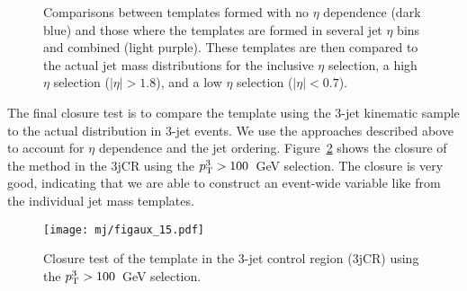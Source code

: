 \begin{figure}[!ht]
  \centering
  
    
  \caption{Comparisons between templates formed with no $\eta$ dependence (dark blue) and those where the templates are formed in several jet $\eta$ bins and combined (light purple). These templates are then compared to the actual jet mass distributions for the
            inclusive $\eta$ selection, 
            a high $\eta$ selection ($|\eta|>1.8$), and
            a low $\eta$ selection ($|\eta|<0.7$).
          }
           
  \label{fig:search:search:background:closure:eta}
\end{figure} 

The final closure test is to compare the \MJ template using the 3-jet kinematic sample to the actual \MJ distribution in 3-jet events. We use the approaches described above to account for $\eta$ dependence and the jet ordering. Figure~\ref{fig:search:search:background:closure:MJ} shows the closure of the method in the 3jCR using the $p_{\text{T}}^{3}>100$~GeV selection. The closure is very good, indicating that we are able to construct an event-wide variable like \MJ from the individual jet mass templates.

\begin{figure}[!ht]
  \centering
  \texttt{[image: mj/figaux\_15.pdf]}
  \caption{Closure test of the \MJ template in the 3-jet control region (3jCR) using the $p_{\text{T}}^{3}>100$~GeV selection.}
  \label{fig:search:search:background:closure:MJ}
\end{figure}



